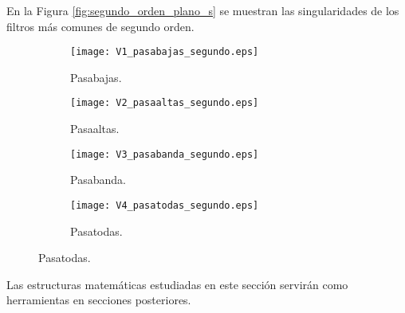	En la Figura \ref{fig:segundo_orden_plano_s} se muestran las singularidades de los filtros más comunes de segundo orden.
	\begin{figure}[!ht]
	\centering   
	\caption{Singularidades de filtros de segundo orden en el plano $s$.}
	\label{fig:segundo_orden_plano_s}
		\begin{subfigure}{0.48\textwidth}
			\centering   
			\texttt{[image: V1\_pasabajas\_segundo.eps]} 
			\caption{Pasabajas.}
			\label{fig:V1_pasabajas_segundo}
		\end{subfigure}
		\begin{subfigure}{0.48\textwidth}
			\centering   
			\texttt{[image: V2\_pasaaltas\_segundo.eps]}
			\caption{Pasaaltas.}
			\label{fig:V2_pasaaltas_segundo}
		\end{subfigure}
		\begin{subfigure}{0.48\textwidth}
			\centering   
			\texttt{[image: V3\_pasabanda\_segundo.eps]} 
			\caption{Pasabanda.}
			\label{fig:V3_pasabanda_segundo}
		\end{subfigure}
		\begin{subfigure}{0.48\textwidth}
			\centering   
			\texttt{[image: V4\_pasatodas\_segundo.eps]}
			\caption{Pasatodas.}
			\label{fig:V4_pasatodas_segundo}
		\end{subfigure}
	\end{figure}
	
	Las estructuras matemáticas estudiadas en este sección servirán como herramientas en secciones posteriores. 